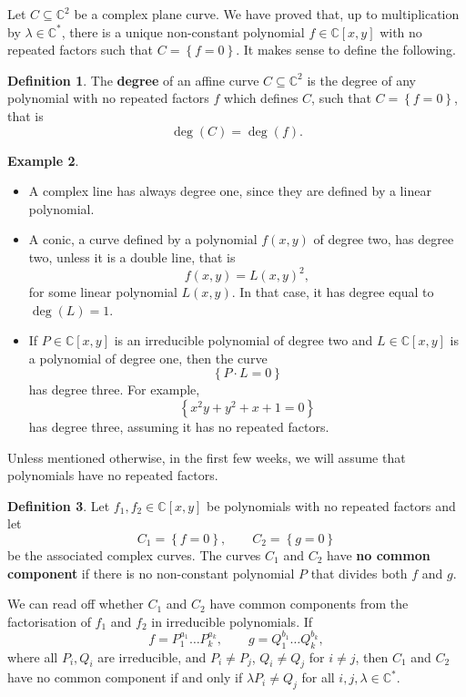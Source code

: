 \documentclass{article}
\newcommand{\C}{\mathbb{C}}
\newcommand{\rb}[1]{\left( #1 \right)}
\renewcommand{\sb}[1]{\left[ #1 \right]}
\newcommand{\cb}[1]{\left\{ #1 \right\}}
\theoremstyle{definition}\newtheorem{definition}{Definition}[section]
\theoremstyle{definition}\newtheorem{notation}[definition]{Notation}
\theoremstyle{definition}\newtheorem{remark}[definition]{Remark}
\theoremstyle{definition}\newtheorem{example1}[definition]{Example}
\theoremstyle{definition}\newtheorem{fact}{Fact}
\theoremstyle{definition}\newtheorem{exercise}{Exercise}
\theoremstyle{definition}\newtheorem*{example2}{Example}
\begin{document}
Let $ C \subseteq \C^2 $ be a complex plane curve. We have proved that, up to multiplication by $ \lambda \in \C^* $, there is a unique non-constant polynomial $ f \in \C\sb{x, y} $ with no repeated factors such that $ C = \cb{f = 0} $. It makes sense to define the following.

\begin{definition}
The \textbf{degree} of an affine curve $ C \subseteq \C^2 $ is the degree of any polynomial with no repeated factors $ f $ which defines $ C $, such that $ C = \cb{f = 0} $, that is
$$ \deg\rb{C} = \deg\rb{f}. $$
\end{definition}

\begin{example1}
\hfill
\begin{itemize}
\item A complex line has always degree one, since they are defined by a linear polynomial.
\item A conic, a curve defined by a polynomial $ f\rb{x, y} $ of degree two, has degree two, unless it is a double line, that is
$$ f\rb{x, y} = L\rb{x, y}^2, $$
for some linear polynomial $ L\rb{x, y} $. In that case, it has degree equal to $ \deg\rb{L} = 1 $.
\item If $ P \in \C\sb{x, y} $ is an irreducible polynomial of degree two and $ L \in \C\sb{x, y} $ is a polynomial of degree one, then the curve
$$ \cb{P \cdot L = 0} $$
has degree three. For example,
$$ \cb{x^2y + y^2 + x + 1 = 0} $$
has degree three, assuming it has no repeated factors.
\end{itemize}
\end{example1}

Unless mentioned otherwise, in the first few weeks, we will assume that polynomials have no repeated factors.

\begin{definition}
Let $ f_1, f_2 \in \C\sb{x, y} $ be polynomials with no repeated factors and let
$$ C_1 = \cb{f = 0}, \qquad C_2 = \cb{g = 0} $$
be the associated complex curves. The curves $ C_1 $ and $ C_2 $ have \textbf{no common component} if there is no non-constant polynomial $ P $ that divides both $ f $ and $ g $.
\end{definition}

We can read off whether $ C_1 $ and $ C_2 $ have common components from the factorisation of $ f_1 $ and $ f_2 $ in irreducible polynomials. If
$$ f = P_1^{a_1} \dots P_k^{a_k}, \qquad g = Q_1^{b_1} \dots Q_k^{b_k}, $$
where all $ P_i, Q_i $ are irreducible, and $ P_i \ne P_j $, $ Q_i \ne Q_j $ for $ i \ne j $, then $ C_1 $ and $ C_2 $ have no common component if and only if $ \lambda P_i \ne Q_j $ for all $ i, j, \lambda \in \C^* $.
\end{document}
